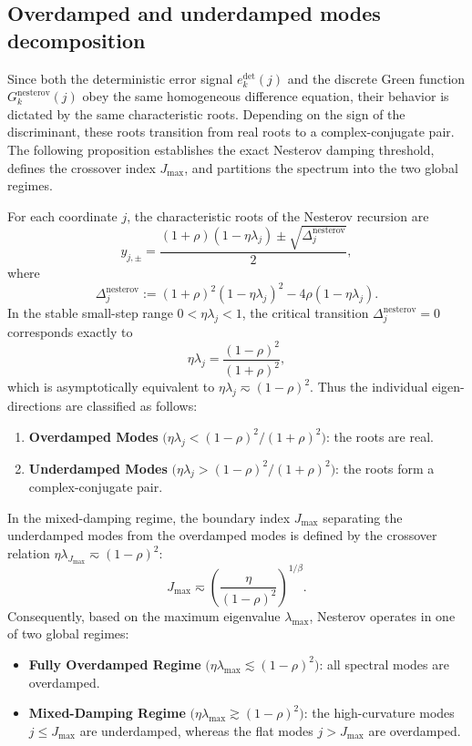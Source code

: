 \documentclass[11pt]{article}
\newcommand{\nesterov}{\mathrm{nesterov}}
\begin{document}
\subsection{Overdamped and underdamped modes decomposition}
\label{app:nes_decomp_modes}

Since both the deterministic error signal $e_k^{\mathrm{det}}(j)$ and the discrete Green function $G_k^{\nesterov}(j)$ obey the same homogeneous difference equation, their behavior is dictated by the same characteristic roots. Depending on the sign of the discriminant, these roots transition from real roots to a complex-conjugate pair. The following proposition establishes the exact Nesterov damping threshold, defines the crossover index $J_{\max}$, and partitions the spectrum into the two global regimes.

\begin{proposition}
\label{prop:nes_mode_decomposition}
For each coordinate $j$, the characteristic roots of the Nesterov recursion are
\[
    y_{j,\pm}
    =
    \frac{(1+\rho)(1-\eta\lambda_j)\pm\sqrt{\Delta_j^{\nesterov}}}{2},
\]
where
\[
    \Delta_j^{\nesterov}
    :=
    (1+\rho)^2(1-\eta\lambda_j)^2
    -4\rho(1-\eta\lambda_j).
\]
In the stable small-step range $0<\eta\lambda_j<1$, the critical transition $\Delta_j^{\nesterov}=0$ corresponds exactly to
\[
    \eta\lambda_j
    =
    \frac{(1-\rho)^2}{(1+\rho)^2},
\]
which is asymptotically equivalent to $\eta\lambda_j\eqsim(1-\rho)^2$. Thus the individual eigen-directions are classified as follows:
\begin{enumerate}
    \item \textbf{Overdamped Modes} $\bigl(\eta\lambda_j<(1-\rho)^2/(1+\rho)^2\bigr)$: the roots are real.
    \item \textbf{Underdamped Modes} $\bigl(\eta\lambda_j>(1-\rho)^2/(1+\rho)^2\bigr)$: the roots form a complex-conjugate pair.
\end{enumerate}
In the mixed-damping regime, the boundary index $J_{\max}$ separating the underdamped modes from the overdamped modes is defined by the crossover relation $\eta\lambda_{J_{\max}}\eqsim(1-\rho)^2$:
\begin{equation}
\label{eq:J_max_nes}
    J_{\max}
    \eqsim
    \left(\frac{\eta}{(1-\rho)^2}\right)^{1/\beta}.
\end{equation}
Consequently, based on the maximum eigenvalue $\lambda_{\max}$, Nesterov operates in one of two global regimes:
\begin{itemize}
    \item \textbf{Fully Overdamped Regime} $\bigl(\eta\lambda_{\max}\lesssim(1-\rho)^2\bigr)$: all spectral modes are overdamped.
    \item \textbf{Mixed-Damping Regime} $\bigl(\eta\lambda_{\max}\gtrsim(1-\rho)^2\bigr)$: the high-curvature modes $j\le J_{\max}$ are underdamped, whereas the flat modes $j>J_{\max}$ are overdamped.
\end{itemize}
\end{proposition}
\end{document}
